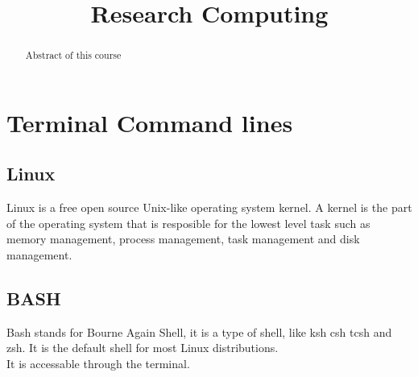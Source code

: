 \documentclass[12pt,a4paper]{article}
\newcommand{\topic}{Research Computing}
\begin{document}
\title{\topic}
\begin{titlepage}
    \maketitle
\end{titlepage}

\tableofcontents

\newpage
\begin{abstract}
\noindent
Abstract of this course
\end{abstract}

\section{Terminal Command lines}

\subsection{Linux}
Linux is a free open source Unix-like operating system kernel.
A kernel is the part of the operating system that is resposible for the lowest level task such as memory management, process management, task management and disk management.\\

\subsection{BASH}
Bash stands for Bourne Again Shell, it is a type of shell, like ksh csh tcsh and zsh. It is the default shell for most Linux distributions.\\
It is accessable through the terminal.\\
\end{document}

